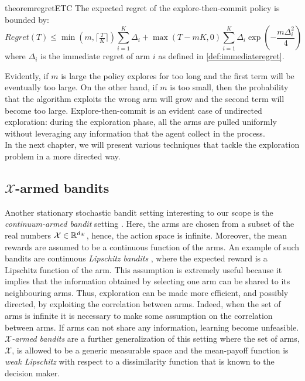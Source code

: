 \begin{restatable}{theorem}{regretETC}\label{th:regretETC}\cite{lattimore2019bandit}
The expected regret of the explore-then-commit policy is bounded by:
\begin{equation}
Regret(T) \leq \min\left(m, \lceil\tfrac{T}{K}\rceil\right)\sum_{i=1}^{K}\Delta_i+\max\left(T-mK, 0\right)\sum_{i=1}^{K}\Delta_i\exp\left(-\frac{m\Delta_i^2}{4}\right)
\end{equation}
where $\Delta_i$ is the immediate regret of arm $i$ as defined in \ref{def:immediateregret}.
\end{restatable}

Evidently, if $m$ is large  the policy explores for too long and the first term will be eventually too large. On the other hand, if $m$ is too small, then the probability that the algorithm exploits the wrong arm will grow and the second term will become too large. Explore-then-commit is an evident case of undirected exploration: during the exploration phase, all the arms are pulled uniformly without leveraging any information that the agent collect in the process.\\
In the next chapter, we will present various techniques that tackle the exploration problem in a more directed way.

\subsection{$\mathcal{X}$-armed bandits} \label{sub:xarmedbandits}
Another stationary stochastic bandit setting interesting to our scope is the \emph{continuum-armed bandit} setting \cite{agrawal1995continuum}. Here, the arms are chosen from a subset of the real numbers $\mathcal{X}\in\mathbb{R}^{d_{\mathcal{X}}} $, hence, the action space is infinite. Moreover, the mean rewards are assumed to be a continuous function of the arms. An example of such bandits are continuous \emph{Lipschitz bandits} \cite{magureanu2014lipschitz}, where the expected reward is a Lipschitz function of the arm. This assumption is extremely useful because it implies that the information obtained by selecting one arm can be shared to its neighbouring arms. Thus, exploration can be made more efficient, and possibly directed, by exploiting the correlation between arms. Indeed, when the set of arms is infinite it is necessary to make some assumption on the correlation between arms. If arms can not share any information, learning become unfeasible. \emph{$\mathcal{X}$-armed bandits} \cite{bubeck2011x} are a further generalization of this setting where the set of arms, $\mathcal{X}$, is allowed to be a generic measurable space and the mean-payoff function is \emph{weak Lipschitz} with respect to a dissimilarity function that is known to the decision maker.


